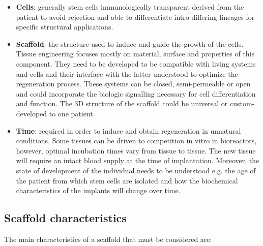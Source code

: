 \begin{multicols}{2}
  \begin{itemize}
    \item \textbf{Cells}: generally stem cells immunologically transparent derived from the patient to avoid rejection and able to differentiate intro differing lineages for specific structural applications.
    \item \textbf{Scaffold}: the structure used to induce and guide the growth of the cells.
      Tissue engineering focuses mostly on material, surface and properties of this component.
      They need to be developed to be compatible with living systems and cells and their interface with the latter understood to optimize the regeneration process.
      These systems can be closed, semi-permeable or open and could incorporate the biologic signalling necessary for cell differentiation and function.
      The 3D structure of the scaffold could be universal or custom-developed to one patient.
    \item \textbf{Time}: required in order to induce and obtain regeneration in unnatural conditions.
      Some tissues can be driven to competition in vitro in bioreactors, however, optimal incubation times vary from tissue to tissue.
      The new tissue will require an intact blood supply at the time of implantation.
      Moreover, the state of development of the individual needs to be understood e.g. the age of the patient from which stem cells are isolated and how the biochemical characteristics of the implants will change over time.
  \end{itemize}
\end{multicols}

  \subsection{Scaffold characteristics}
  The main characteristics of a scaffold that must be considered are:

